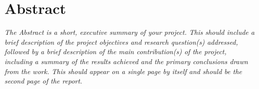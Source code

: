 \section*{Abstract}

\emph{The Abstract is a short, executive summary of your project. This should include a brief description of the project objectives and research question(s) addressed, followed by a brief description of the main contribution(s) of the project, including a summary of the results achieved and the primary conclusions drawn from the work. This should appear on a single page by itself and should be the second page of the report.}
